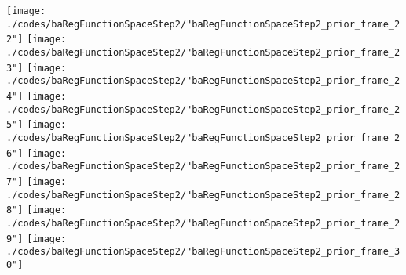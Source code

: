 \begin{frame}{\insertsection}
\begin{center}
{\begin{animateinline}{15}
				 \texttt{[image: ./codes/baRegFunctionSpaceStep2/"baRegFunctionSpaceStep2\_prior\_frame\_22"]}\newframe
				 \texttt{[image: ./codes/baRegFunctionSpaceStep2/"baRegFunctionSpaceStep2\_prior\_frame\_23"]}\newframe
				 \texttt{[image: ./codes/baRegFunctionSpaceStep2/"baRegFunctionSpaceStep2\_prior\_frame\_24"]}\newframe
				 \texttt{[image: ./codes/baRegFunctionSpaceStep2/"baRegFunctionSpaceStep2\_prior\_frame\_25"]}\newframe
				 \texttt{[image: ./codes/baRegFunctionSpaceStep2/"baRegFunctionSpaceStep2\_prior\_frame\_26"]}\newframe
				 \texttt{[image: ./codes/baRegFunctionSpaceStep2/"baRegFunctionSpaceStep2\_prior\_frame\_27"]}\newframe
				 \texttt{[image: ./codes/baRegFunctionSpaceStep2/"baRegFunctionSpaceStep2\_prior\_frame\_28"]}\newframe
				 \texttt{[image: ./codes/baRegFunctionSpaceStep2/"baRegFunctionSpaceStep2\_prior\_frame\_29"]}\newframe
				 \texttt{[image: ./codes/baRegFunctionSpaceStep2/"baRegFunctionSpaceStep2\_prior\_frame\_30"]}
			 \end{animateinline}
			}
	\end{center}
    
\end{frame}

